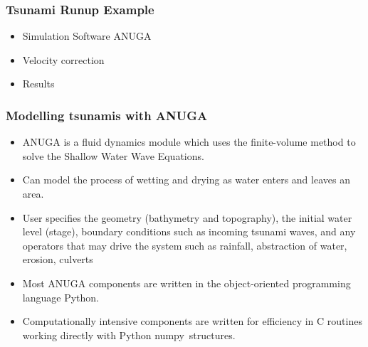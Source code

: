 \documentclass[11pt,ucs]{beamer}
\begin{document}
\begin{frame}\frametitle{Tsunami Runup Example}

\begin{itemize}
\item  Simulation Software ANUGA

\item Velocity correction

\item Results


\end{itemize}

\end{frame}


\begin{frame}\frametitle{Modelling tsunamis with ANUGA}

\begin{itemize}
\item ANUGA is a fluid dynamics module
which uses the finite-volume method to  solve the Shallow Water
Wave Equations.

\item Can model the process of
wetting and drying as water enters and leaves an area.

\item User specifies the geometry
(bathymetry and topography), the initial water level (stage),
boundary conditions such as incoming tsunami waves, and any operators  that may
drive the system such as rainfall, abstraction of water,  erosion, culverts

\item Most ANUGA  components are written in the object-oriented programming
language Python.   

\item Computationally intensive components are written for
efficiency in C routines working directly with Python \mbox{numpy
structures.}

\end{itemize}

\end{frame}
\end{document}
